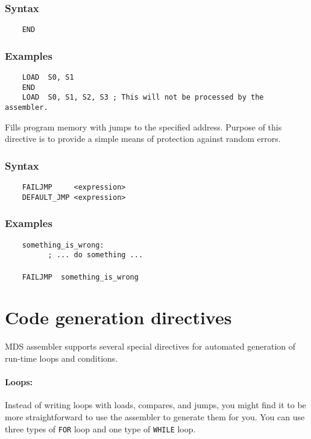     \subsubsection{Syntax}
        \verb'    END'

    \subsubsection{Examples}
        \verb'    LOAD  S0, S1'\\
        \verb'    END'\\
        \verb'    LOAD  S0, S1, S2, S3 ; This will not be processed by the assembler.'

    Fills program memory with jumps to the specified address. Purpose of this directive is to provide a simple means of protection against random errors.

    \subsubsection{Syntax}
        \verb'    FAILJMP     <expression>'\\
        \verb'    DEFAULT_JMP <expression>'

    \subsubsection{Examples}
        \verb'    something_is_wrong:'\\
        \verb'          ; ... do something ...'\\
        \verb''\\
        \verb'    FAILJMP  something_is_wrong'

\clearpage
\section{Code generation directives}
    MDS assembler supports several special directives for automated generation of run-time loops and conditions.

    \paragraph{Loops:} Instead of writing loops with loads, compares, and jumps, you might find it to be more straightforward to use the assembler to generate them for you. You can use three types of \texttt{FOR} loop and one type of \texttt{WHILE} loop.

